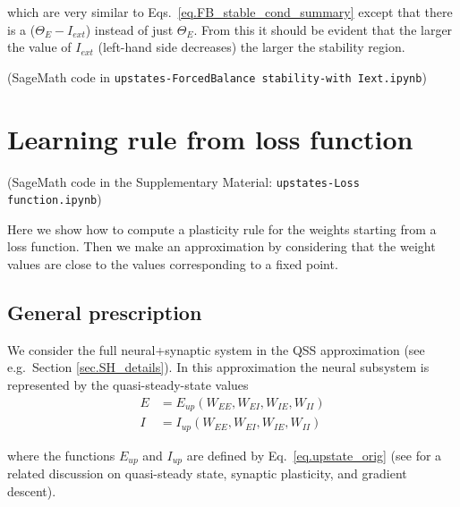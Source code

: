\documentclass[twocolumn]{article}
\newcommand{\EE}{\mathit{EE}}
\newcommand{\EI}{\mathit{EI}}
\newcommand{\IE}{\mathit{IE}}
\newcommand{\II}{\mathit{II}}
\newcommand{\ext}{\mathit{ext}}
\newcommand{\up}{\mathit{up}}
\begin{document}
\noindent which are very similar to Eqs.\ \ref{eq.FB_stable_cond_summary} except that there is a ($\Theta_E - I_{\ext}$) instead of just $\Theta_E$. From this it should be evident that the larger the value of $I_{\ext}$ (left-hand side decreases) the larger the stability region.

(SageMath code in {\tt upstates-ForcedBalance stability-with Iext.ipynb})





\section{Learning rule from loss function}

(SageMath code in the Supplementary Material: {\tt upstates-Loss function.ipynb})

Here we show how to compute a plasticity rule for the weights starting from a loss function. Then we make an approximation by considering that the weight values are close to the values corresponding to a fixed point.


\subsection{General prescription}

We consider the full neural+synaptic system in the QSS approximation (see e.g.\ Section \ref{sec.SH_details}). In this approximation the neural subsystem is represented by the quasi-steady-state values
\begin{equation}
\begin{aligned}
E & = E_{\up}(W_{\EE},W_{\EI},W_{\IE},W_{\II}) \\
I & = I_{\up}(W_{\EE},W_{\EI},W_{\IE},W_{\II})
\label{eq.LF_EIup}
\end{aligned}
\end{equation}

\noindent where the functions $E_{\up}$ and $I_{\up}$ are defined by Eq.\ \ref{eq.upstate_orig} (see \cite{Mackwood2020} for a related discussion on quasi-steady state, synaptic plasticity, and gradient descent).
\end{document}
